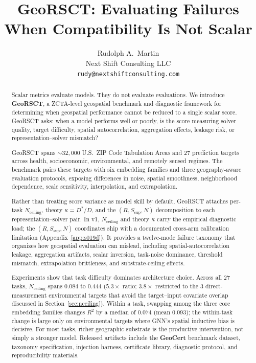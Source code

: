 \documentclass{article}
\title{GeoRSCT: Evaluating Failures When Compatibility Is Not Scalar}
\author{%
  Rudolph A.\ Martin \\
  Next Shift Consulting LLC \\
  \texttt{rudy@nextshiftconsulting.com}
}
\begin{document}
\maketitle

\begin{abstract}
Scalar metrics evaluate models. They do not evaluate evaluations. We introduce \textbf{GeoRSCT}, a ZCTA-level geospatial benchmark and diagnostic framework for determining when geospatial performance cannot be reduced to a single scalar score. GeoRSCT asks: when a model performs well or poorly, is the score measuring solver quality, target difficulty, spatial autocorrelation, aggregation effects, leakage risk, or representation--solver mismatch?

GeoRSCT spans ${\sim}32{,}000$ U.S.\ ZIP Code Tabulation Areas and 27 prediction targets across health, socioeconomic, environmental, and remotely sensed regimes. The benchmark pairs these targets with six embedding families and three geography-aware evaluation protocols, exposing differences in noise, spatial smoothness, neighborhood dependence, scale sensitivity, interpolation, and extrapolation.

Rather than treating score variance as model skill by default, GeoRSCT attaches per-task $N_{\text{ceiling}}$, theory $\kappa = D^*/D$, and the $(R, S_{\text{sup}}, N)$ decomposition to each representation--solver pair. In v1, $N_{\text{ceiling}}$ and theory $\kappa$ carry the empirical diagnostic load; the $(R, S_{\text{sup}}, N)$ coordinates ship with a documented cross-arm calibration limitation (Appendix~\ref{app:s019d}). It provides a twelve-mode failure taxonomy that organizes how geospatial evaluation can mislead, including spatial-autocorrelation leakage, aggregation artifacts, scalar inversion, task-noise dominance, threshold mismatch, extrapolation brittleness, and substrate-ceiling effects.

Experiments show that task difficulty dominates architecture choice. Across all 27 tasks, $N_{\text{ceiling}}$ spans $0.084$ to $0.444$ ($5.3{\times}$ ratio; $3.8{\times}$ restricted to the 3 direct-measurement environmental targets that avoid the target--input covariate overlap discussed in Section~\ref{sec:nceiling}). Within a task, swapping among the three core embedding families changes $R^2$ by a median of $0.074$ (mean $0.093$); the within-task change is large only on environmental targets where GNN's spatial inductive bias is decisive. For most tasks, richer geographic substrate is the productive intervention, not simply a stronger model. Released artifacts include the \textbf{GeoCert} benchmark dataset, taxonomy specification, injection harness, certificate library, diagnostic protocol, and reproducibility materials.
\end{abstract}
\end{document}
